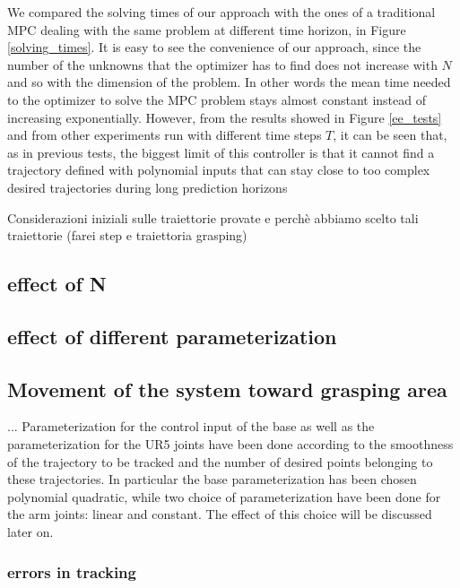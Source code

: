 We compared the solving times of our approach with the ones of a traditional MPC dealing with the same problem at different time horizon, in Figure \ref{solving_times}. It is easy to see the convenience of our approach, since the number of the unknowns that the optimizer has to find does not increase with $N$ and so with the dimension of the problem. In other words the mean time needed to the optimizer to solve the MPC problem stays almost constant instead of increasing exponentially.
However, from the results showed in Figure \ref{ee_tests} and from other experiments run with different time steps $T$, it can be seen that, as in previous tests, the biggest limit of this controller is that it cannot find a trajectory defined with polynomial inputs that can stay close to too complex desired trajectories during long prediction horizons

Considerazioni iniziali sulle traiettorie provate e perchè abbiamo scelto tali traiettorie (farei step e traiettoria grasping)
	\subsection{effect of N}
		
	\subsection{effect of different parameterization}
		
	\subsection{Movement of the system toward grasping area}
 ... Parameterization for the control input of the base as well as the parameterization for the UR5 joints have been done according to the smoothness of the trajectory to be tracked and the number of desired points belonging to these trajectories. In particular the base parameterization has been chosen polynomial quadratic, while two choice of parameterization have been done for the arm joints: linear and constant. The effect of this choice will be discussed later on. 
		\subsubsection{errors in tracking}
			
